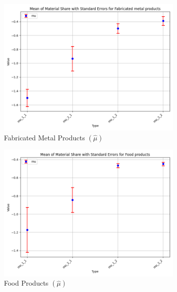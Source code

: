 \documentclass{article}
\begin{document}
\begin{figure}[ht!]
    \begin{subfigure}[t]{0.32\textwidth}
        \centering
        \includegraphics[width=\textwidth]{figure/empirical_stat_mixture_mu_with_error_bars_Fabricated metal products.png}
        \caption{Fabricated Metal Products $(\hat\mu)$}
    \end{subfigure}
    \begin{subfigure}[t]{0.32\textwidth}
        \centering
        \includegraphics[width=\textwidth]{figure/empirical_stat_mixture_mu_with_error_bars_Food products.png}
        \caption{Food Products $(\hat\mu)$}
    \end{subfigure}
    \begin{subfigure}[t]{0.32\textwidth}
        \centering

\end{subfigure}
\end{figure}
\end{document}
